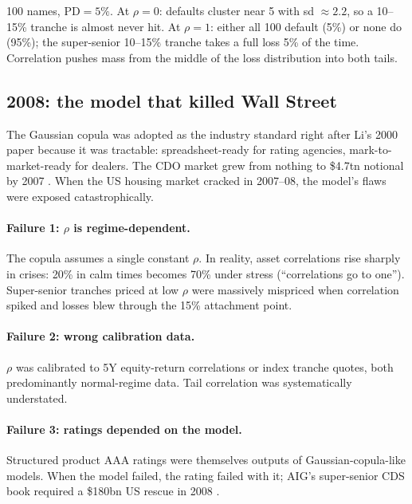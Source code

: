 \begin{intuitionbox}
100 names, $\mathrm{PD} = 5\%$.  At $\rho = 0$: defaults cluster
near 5 with sd $\approx 2.2$, so a 10--15\% tranche is almost never
hit.  At $\rho = 1$: either all 100 default (5\%) or none do (95\%);
the super-senior 10--15\% tranche takes a full loss 5\% of the time.
Correlation pushes mass from the middle of the loss distribution
into both tails.
\end{intuitionbox}

\subsection{2008: the model that killed Wall Street}

The Gaussian copula was adopted as the industry standard right
after Li's 2000 paper because it was tractable: spreadsheet-ready
for rating agencies, mark-to-market-ready for dealers.  The CDO
market grew from nothing to \$4.7tn notional by 2007
\citep{salmon2009formula}.  When the US housing market cracked in
2007--08, the model's flaws were exposed catastrophically.

\paragraph{Failure 1: $\rho$ is regime-dependent.}  The copula
assumes a single constant $\rho$.  In reality, asset correlations
rise sharply in crises: 20\% in calm times becomes 70\% under
stress (``correlations go to one'').  Super-senior tranches priced
at low $\rho$ were massively mispriced when correlation spiked and
losses blew through the 15\% attachment point.

\paragraph{Failure 2: wrong calibration data.}  $\rho$ was
calibrated to 5Y equity-return correlations or index tranche
quotes, both predominantly normal-regime data.  Tail correlation
was systematically understated.

\paragraph{Failure 3: ratings depended on the model.}  Structured
product AAA ratings were themselves outputs of
Gaussian-copula-like models.  When the model failed, the rating
failed with it; AIG's super-senior CDS book required a \$180bn US
rescue in 2008 \citeHull.

